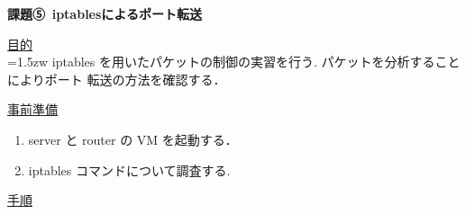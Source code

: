 \documentclass[dvipdfmx,autodetect-engine, 12pt]{jsarticle}
\begin{document}
\begin{center}

{\LARGE \bfseries 課題⑤\, iptablesによるポート転送\par}

\end{center}

\vspace{1cm}

{\LARGE \uline{目的}} \\

\hangindent=1.5zw
\noindent
iptables を用いたパケットの制御の実習を行う. パケットを分析することによりポート
転送の方法を確認する．

\vspace{1cm}

{\LARGE \uline{事前準備}} 

\begin{enumerate}
    \item server と router の VM を起動する．
    \item iptables コマンドについて調査する.
\end{enumerate}

\vspace{1cm}

{\LARGE \uline{手順}} 
\end{document}
